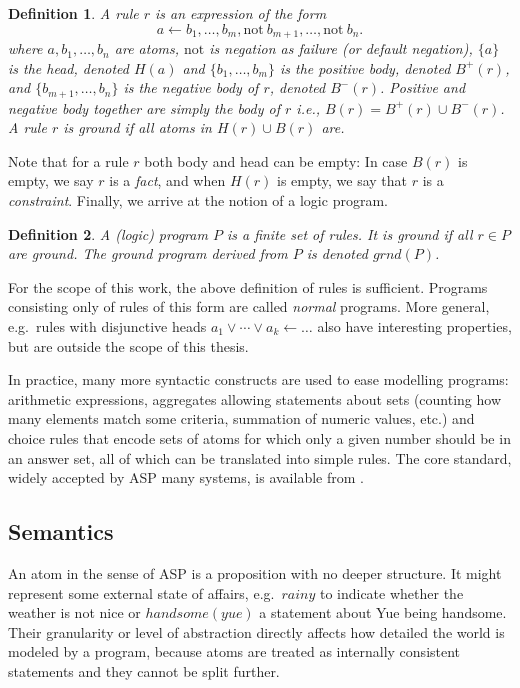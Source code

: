 \documentclass{vutinfth} %
\newtheorem{definition}{Definition}[chapter]
\newcommand{\headf}{H}
\newcommand{\bodyf}{B}
\newcommand{\fail}{\mathrm{not } \ \xspace}
\newcommand{\from}{\ensuremath{\leftarrow}}
\begin{document}
\begin{definition}
A \emph{rule} $r$ is an expression of the form $$a \from b_1, \ldots, b_m, \fail b_{m+1}, \ldots, \fail b_n.$$ where $a, b_1, \ldots, b_n$ are atoms, $\mathrm{not}$ is \emph{negation as failure} (or \emph{default negation}), $\{ a \}$ is the \emph{head}, denoted $\headf(a)$ and $\{ b_1, \ldots, b_m \}$ is the \emph{positive body}, denoted $\bodyf^+(r)$, and $\{ b_{m+1}, \ldots, b_n \}$ is the \emph{negative body} of $r$, denoted $\bodyf^-(r)$. Positive and negative body together are simply the \emph{body} of $r$ i.e., $\bodyf(r) = \bodyf^+(r)\cup \bodyf^-(r)$.
A rule $r$ is \emph{ground} if all atoms in $\headf(r) \cup \bodyf(r)$ are.
\end{definition}

Note that for a rule $r$ both body and head can be empty: In case $\bodyf(r)$ is empty, we say $r$ is a \emph{fact}, and when $\headf(r)$ is empty, we say that $r$ is a \emph{constraint}. Finally, we arrive at the notion of a logic program.

\begin{definition}
A \emph{(logic) program} $P$ is a finite set of rules. It is \emph{ground} if all $r \in P$ are ground. The ground program derived from $P$ is denoted $grnd(P)$.
\end{definition}

For the scope of this work, the above definition of rules is sufficient. Programs consisting only of rules of this form are called \emph{normal} programs. More general, e.g.~rules with disjunctive heads $a_1 \vee \cdots \vee a_k \from \ldots$ also have interesting properties, but are outside the scope of this thesis.

In practice, many more syntactic constructs are used to ease modelling programs: arithmetic expressions, aggregates allowing statements about sets (counting how many elements match some criteria, summation of numeric values, etc.) and choice rules that encode sets of atoms for which only a given number should be in an answer set, all of which can be translated into simple rules. The core standard, widely accepted by ASP many systems, is available from \cite{calimeri2015asp}.

\subsection{Semantics}

An atom in the sense of ASP is a proposition with no deeper structure. It might represent some external state of affairs, e.g.~$rainy$ to indicate whether the weather is not nice or $handsome(yue)$ a statement about Yue being handsome. Their granularity or level of abstraction directly affects how detailed the world is modeled by a program, because atoms are treated as internally consistent statements and they cannot be split further.
\end{document}
